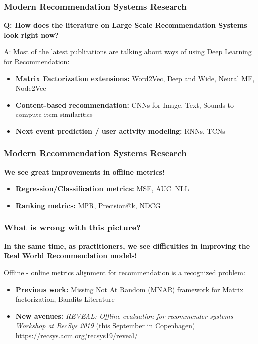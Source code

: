   




 
\begin{frame}
  \frametitle{Modern Recommendation Systems Research}
  
  \textbf{Q: How does the literature on Large Scale Recommendation Systems look right now?}
  
  A: Most of the latest publications are talking about ways of using Deep Learning for Recommendation:
  \begin{itemize}
  \item \textbf{Matrix Factorization extensions:} Word2Vec, Deep and Wide, Neural MF, Node2Vec 
  \item \textbf{Content-based recommendation:} CNNs for Image, Text, Sounds to compute item similarities
  \item \textbf{Next event prediction / user activity modeling:} RNNs, TCNs
  \end{itemize}
  
\end{frame}


\begin{frame}
  \frametitle{Modern Recommendation Systems Research}
  
  \textbf{We see great improvements in offline metrics!}
  
  \begin{itemize}
  \item \textbf{Regression/Classification metrics:} MSE, AUC, NLL
  \item \textbf{Ranking metrics:} MPR, Precision@k, NDCG
  \end{itemize}
  
\end{frame}


\begin{frame}
  \frametitle{What is wrong with this picture?}
  
	\textbf{In the same time, as practitioners, we see difficulties in improving the Real World Recommendation models!}

	Offline - online metrics alignment for recommendation is a recognized problem:
	\begin{itemize}
	\item \textbf{Previous work:} Missing Not At Random (MNAR) framework for Matrix factorization, Bandits Literature
	\item \textbf{New avenues:}  \emph{REVEAL: Offline evaluation for recommender systems Workshop at RecSys 2019} (this September in Copenhagen) \url{https://recsys.acm.org/recsys19/reveal/}
	\end{itemize}
  
\end{frame}


